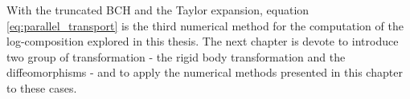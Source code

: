 With the truncated BCH and the Taylor expansion, equation \ref{eq:parallel_transport} is the third numerical method for the computation of the log-composition explored in this thesis. The next chapter is devote to introduce two group of transformation - the rigid body transformation and the diffeomorphisms - and to apply the numerical methods presented in this chapter to these cases.










